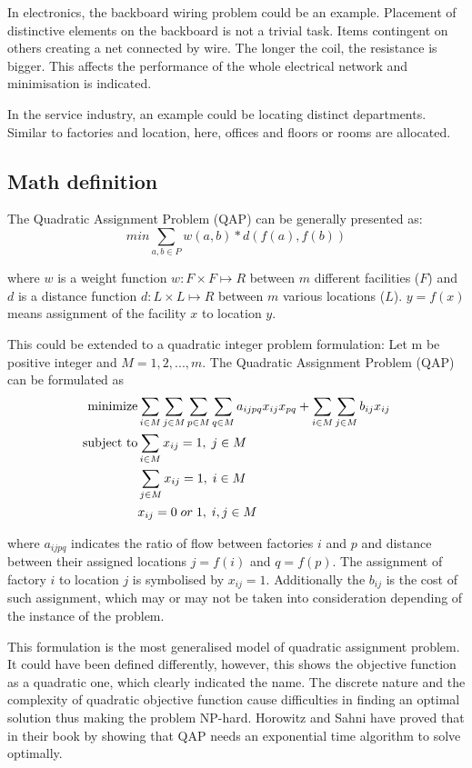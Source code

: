 In electronics, the backboard wiring problem could be an example.
Placement of distinctive elements on the backboard is not a trivial task.
Items contingent on others creating a net connected by wire.
The longer the coil, the resistance is bigger.
This affects the performance of the whole electrical network and minimisation is indicated.

In the service industry, an example could be locating distinct departments.
Similar to factories and location, here, offices and floors or rooms are allocated.

\subsection{Math definition}
The Quadratic Assignment Problem (QAP) can be generally presented as:
\begin{equation}
min \sum_{a, b \in P } w(a, b) * d( f(a), f(b))
\end{equation}

where $w$ is a weight function $w: F \times F \mapsto R$ between $m$ different facilities ($F$) and $d$ is a distance function $d: L \times L \mapsto R$ between $m$ various locations ($L$). $y = f(x)$ means assignment of the facility $x$ to location $y$.

This could be extended to a quadratic integer problem formulation:
Let m be positive integer and $M = { 1, 2, ..., m }$. The Quadratic Assignment Problem (QAP) can be formulated as
\begin{align}
  \text{minimize} &\null \sum_{i \in M} \sum_{j \in M} \sum_{p \in M} \sum_{q \in M} a_{ijpq}x_{ij}x_{pq} + \sum_{i \in M} \sum_{j \in M} b_{ij} x_{ij} \\
  \text{subject to} &\null \sum_{i \in M} x_{ij} = 1, \; j \in M \\
  &\null \sum_{j \in M} x_{ij} = 1, \; i \in M \\
  &\null x_{ij} = 0 \; or \; 1, \; i, j \in M
\end{align}

where $a_{ijpq}$ indicates the ratio of flow between factories $i$ and $p$ and distance between their assigned locations $j = f(i)$ and $q = f(p)$.
The assignment of factory $i$ to location $j$ is symbolised by $x_{ij} = 1$.
Additionally the $b_{ij}$ is the cost of such assignment, which may or may not be taken into consideration depending of the instance of the problem.

This formulation is the most generalised model of quadratic assignment problem.
It could have been defined differently, however, this shows the objective function as a quadratic one, which clearly indicated the name.
The discrete nature and the complexity of quadratic objective function cause difficulties in finding an optimal solution thus making the problem NP-hard.
Horowitz and Sahni have proved that in their book \cite{horowitz1978fundamentals} by showing that QAP needs an exponential time algorithm to solve optimally.


